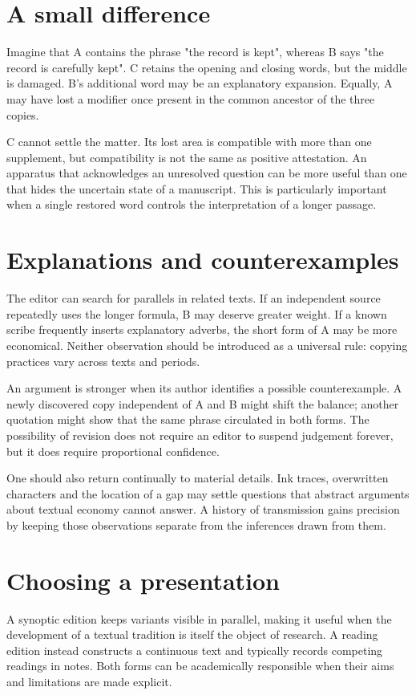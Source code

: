 \documentclass{impebook}
\begin{document}
\section{A small difference}
Imagine that A contains the phrase "the record is kept",
whereas B says "the record is carefully kept". C retains
the opening and closing words, but the middle is damaged.
B's additional word may be an explanatory expansion.
Equally, A may have lost a modifier once present in the
common ancestor of the three copies.

C cannot settle the matter. Its lost area is compatible
with more than one supplement, but compatibility is not
the same as positive attestation. An apparatus that
acknowledges an unresolved question can be more useful
than one that hides the uncertain state of a manuscript.
This is particularly important when a single restored
word controls the interpretation of a longer passage.

\section{Explanations and counterexamples}
The editor can search for parallels in related texts.
If an independent source repeatedly uses the longer
formula, B may deserve greater weight. If a known
scribe frequently inserts explanatory adverbs, the
short form of A may be more economical. Neither
observation should be introduced as a universal rule:
copying practices vary across texts and periods.

An argument is stronger when its author identifies a
possible counterexample. A newly discovered copy
independent of A and B might shift the balance;
another quotation might show that the same phrase
circulated in both forms. The possibility of revision
does not require an editor to suspend judgement
forever, but it does require proportional confidence.

One should also return continually to material details.
Ink traces, overwritten characters and the location
of a gap may settle questions that abstract arguments
about textual economy cannot answer. A history of
transmission gains precision by keeping those
observations separate from the inferences drawn
from them.

\section{Choosing a presentation}
A synoptic edition keeps variants visible in parallel,
making it useful when the development of a textual
tradition is itself the object of research. A reading
edition instead constructs a continuous text and
typically records competing readings in notes.
Both forms can be academically responsible when
their aims and limitations are made explicit.
\end{document}
